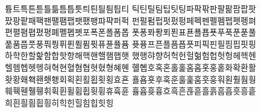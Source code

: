 튱트특튼튿틀틂틈틉틋틔틘틜틤틥티 틱틴틸팀팁팃팅파팍팎판팔팖팜팝팟 \\

팠팡팥패팩팬팰팸팹팻팼팽퍄퍅퍼퍽 펀펄펌펍펏펐펑페펙펜펠펨펩펫펭펴 \\

편펼폄폅폈평폐폘폡폣포폭폰폴폼폽 폿퐁퐈퐝푀푄표푠푤푭푯푸푹푼푿풀 \\

풂품풉풋풍풔풩퓌퓐퓔퓜퓟퓨퓬퓰퓸 퓻퓽프픈플픔픕픗피픽핀필핌핍핏핑 \\

하학한할핥함합핫항해핵핸핼햄햅햇 했행햐향허헉헌헐헒험헙헛헝헤헥헨 \\

헬헴헵헷헹혀혁현혈혐협혓혔형혜혠 혤혭호혹혼홀홅홈홉홋홍홑화확환활 \\

홧황홰홱홴횃횅회획횐횔횝횟횡효횬 횰횹횻후훅훈훌훑훔훗훙훠훤훨훰훵 \\



훼훽휀휄휑휘휙휜휠휨휩휫휭휴휵휸 휼흄흇흉흐흑흔흖흗흘흙흠흡흣흥흩 \\

희흰흴흼흽힁히힉힌힐힘힙힛힝 



%

